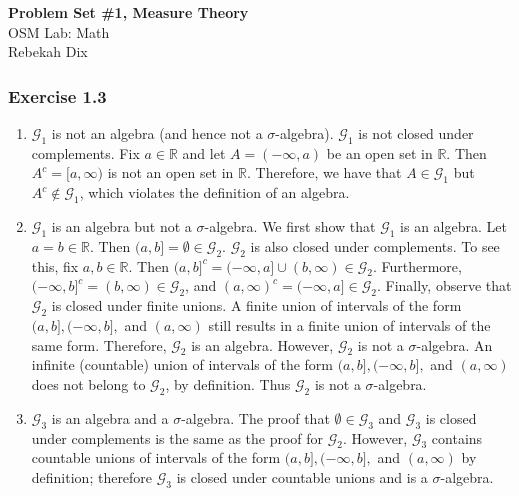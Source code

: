 \documentclass[letterpaper,12pt]{article}
\theoremstyle{definition}
\begin{document}
\begin{flushleft}
  \textbf{\large{Problem Set \#1, Measure Theory}} \\
  OSM Lab: Math \\
  Rebekah Dix
\end{flushleft}

\vspace{5mm}

\subsubsection*{Exercise 1.3}
\begin{enumerate}
  \item $\mathcal{G}_1$ is not an algebra (and hence not a $\sigma$-algebra). $\mathcal{G}_1$ is not closed under complements. Fix $a \in \mathbb{R}$ and let $A = (-\infty, a)$ be an open set in $\mathbb{R}$. Then $A^c = [a, \infty)$ is not an open set in $\mathbb{R}$. Therefore, we have that $A \in \mathcal{G}_1$ but $A^c \not\in \mathcal{G}_1$, which violates the definition of an algebra.
  \item $\mathcal{G}_1$ is an algebra but not a $\sigma$-algebra. We first show that $\mathcal{G}_1$ is an algebra. Let $a = b \in \mathbb{R}$. Then $(a,b] = \emptyset \in \mathcal{G}_2$. $\mathcal{G}_2$ is also closed under complements. To see this, fix $a, b \in \mathbb{R}$. Then $(a,b]^c = (-\infty, a] \cup (b, \infty) \in \mathcal{G}_2$. Furthermore, $(-\infty, b]^c = (b, \infty) \in \mathcal{G}_2$, and $(a, \infty)^c = (-\infty, a] \in \mathcal{G}_2$. Finally, observe that $\mathcal{G}_2$ is closed under finite unions. A finite union of intervals of the form $(a, b], (-\infty, b],$ and $(a, \infty)$ still results in a finite union of intervals of the same form. Therefore, $\mathcal{G}_2$ is an algebra. However, $\mathcal{G}_2$ is not a $\sigma$-algebra. An infinite (countable) union of intervals of the form $(a, b], (-\infty, b],$ and $(a, \infty)$ does not belong to $\mathcal{G}_2$, by definition. Thus $\mathcal{G}_2$ is not a $\sigma$-algebra.
  \item $\mathcal{G}_3$ is an algebra and a $\sigma$-algebra. The proof that $\emptyset \in \mathcal{G}_3$ and $\mathcal{G}_3$ is closed under complements is the same as the proof for $\mathcal{G}_2$. However,  $\mathcal{G}_3$ contains countable unions of intervals of the form $(a, b], (-\infty, b],$ and $(a, \infty)$ by definition; therefore $\mathcal{G}_3$ is closed under countable unions and is a $\sigma$-algebra.
\end{enumerate}
\end{document}
